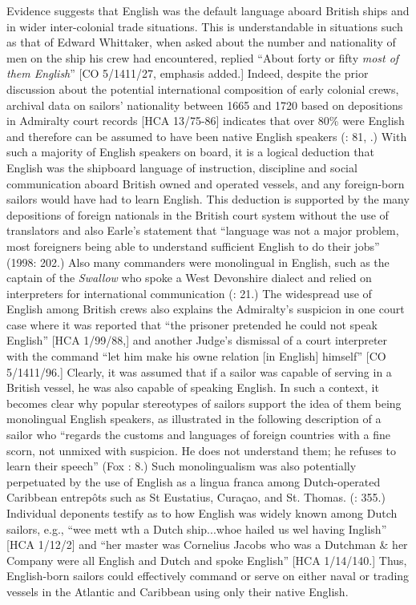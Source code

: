   Evidence suggests that English was the default language aboard British ships and in wider inter-colonial trade situations. This is understandable in situations such as that of Edward Whittaker, when asked about the number and nationality of men on the ship his crew had encountered, replied “About forty or fifty \textit{most of them English}” [CO 5/1411/27, emphasis added.] Indeed, despite the prior discussion about the potential international composition of early colonial crews, archival data on sailors’ nationality between 1665 and 1720 based on depositions in Admiralty court records [HCA 13/75-86] indicates that over 80\% were English and therefore can be assumed to have been native English speakers (\citealt{Earle1993}: 81, .) With such a majority of English speakers on board, it is a logical deduction that English was the shipboard language of instruction, discipline and social communication aboard British owned and operated vessels, and any foreign-born sailors would have had to learn English. This deduction is supported by the many depositions of foreign nationals in the British court system without the use of translators and also Earle’s statement that “language was not a major problem, most foreigners being able to understand sufficient English to do their jobs” (1998: 202.) Also many commanders were monolingual in English, such as the captain of the \textit{Swallow} who spoke a West Devonshire dialect and relied on interpreters for international communication (\citealt{Earle1998}: 21.) The widespread use of English among British crews also explains the Admiralty’s suspicion in one court case where it was reported that “the prisoner pretended he could not speak English” [HCA 1/99/88,] and another Judge’s dismissal of a court interpreter with the command “let him make his owne relation [in English] himself” [CO 5/1411/96.] Clearly, it was assumed that if a sailor was capable of serving in a British vessel, he was also capable of speaking English.  In such a context, it becomes clear why popular stereotypes of sailors support the idea of them being monolingual English speakers, as illustrated in the following description of a sailor who “regards the customs and languages of foreign countries with a fine scorn, not unmixed with suspicion. He does not understand them; he refuses to learn their speech” (Fox \citealt{Smith1924}: 8.) Such monolingualism was also potentially perpetuated by the use of English as a lingua franca among Dutch-operated Caribbean entrepôts such as St Eustatius, Curaçao, and St. Thomas. (\citealt{Jarvis2010}: 355.) Individual deponents testify as to how English was widely known among Dutch sailors, e.g., “wee mett wth a Dutch ship...whoe hailed us wel having Inglish” [HCA 1/12/2] and “her master was Cornelius Jacobs who was a Dutchman \& her Company were all English and Dutch and spoke English” [HCA 1/14/140.] Thus, English-born sailors could effectively command or serve on either naval or trading vessels in the Atlantic and Caribbean using only their native English. 


